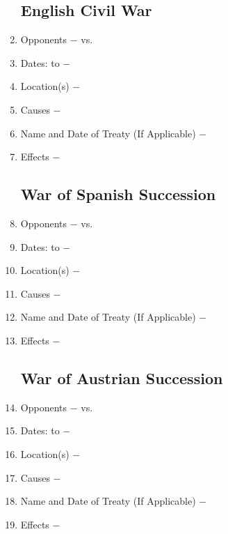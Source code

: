 \documentclass[12pt]{article}
\begin{document}
\begin{enumerate}
\subsection{English Civil War}

\item Opponents $-$ vs.

\item Dates: to $-$

\item Location(s) $-$ 

\item Causes $-$

\item Name and Date of Treaty (If Applicable) $-$ 

\item Effects $-$ 

\subsection{War of Spanish Succession}
 
\item Opponents $-$ vs.

\item Dates: to $-$

\item Location(s) $-$ 

\item Causes $-$

\item Name and Date of Treaty (If Applicable) $-$ 

\item Effects $-$ 

\subsection{War of Austrian Succession}

\item Opponents $-$ vs.

\item Dates: to $-$

\item Location(s) $-$ 

\item Causes $-$

\item Name and Date of Treaty (If Applicable) $-$ 

\item Effects $-$ 


\end{enumerate}
\end{document}
